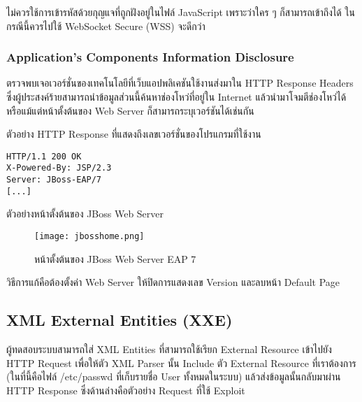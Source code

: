  ไม่ควรใช้การเข้ารหัสด้วยกุญแจที่ถูกฝังอยู่ในไฟล์ JavaScript เพราะว่าใคร ๆ ก็สามารถเข้าถึงได้ ในกรณีนี้ควรไปใช้ WebSocket Secure (WSS) จะดีกว่า
 
 \subsubsection{Application's Components Information Disclosure}
 
 ตรวจพบเจอเวอร์ชั่นของเทคโนโลยีที่เว็บแอปพลิเคชันใช้งานส่งมาใน HTTP Response Headers ซึ่งผู้ประสงค์ร้ายสามารถนำข้อมูลส่วนนี้ค้นหาช่องโหว่ที่อยู่ใน Internet แล้วนำมาโจมตีช่องโหว่ได้ หรือแม้แต่หน้าตั้งต้นของ Web Server ก็สามารถระบุเวอร์ชันได้เช่นกัน
 
 ตัวอย่าง HTTP Response ที่แสดงถึงเลขเวอร์ชั่นของโปรแกรมที่ใช้งาน
 
 \begin{lstlisting}[numbers=none] 
HTTP/1.1 200 OK
X-Powered-By: JSP/2.3
Server: JBoss-EAP/7
[...]
 \end{lstlisting}
 
ตัวอย่างหน้าตั้งต้นของ JBoss Web Server

\newpage

 \begin{figure}[h]
	\centering
	\texttt{[image: jbosshome.png]}
	\caption{หน้าตั้งต้นของ JBoss Web Server EAP 7}
	\label{Fig:jbosshome.png}
\end{figure}

วิธีการแก้คือต้องตั้งค่า Web Server ให้ปิดการแสดงเลข Version และลบหน้า Default Page 
 
\subsection{XML External Entities (XXE)}

ผู้ทดสอบระบบสามารถใส่ XML Entities ที่สามารถใช้เรียก External Resource เข้าไปยัง HTTP Request เพื่อให้ตัว XML Parser นั้น Include ตัว External Resource ที่เราต้องการ (ในที่นี้คือไฟล์ /etc/passwd ที่เก็บรายชื่อ User ทั้งหมดในระบบ) แล้วส่งข้อมูลนั้นกลับมาผ่าน HTTP Response ซึ่งด้านล่างคือตัวอย่าง Request ที่ใช้ Exploit

